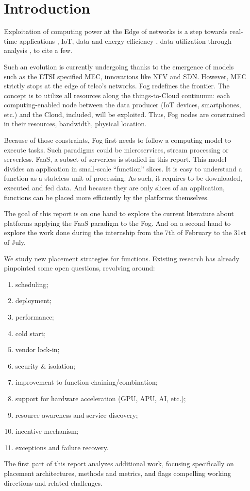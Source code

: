 \section{Introduction}

Exploitation of computing power at the Edge of networks is a step towards real-time applications \cite{rausch_towards_2021,lin_cloudfog_2017}, \gls{IoT}, data and energy efficiency \cite{ieee_standards_association_ieee_2018}, data utilization through analysis \cite{openfog_consortium_real-time_2018}, to cite a few.

Such an evolution is currently undergoing thanks to the emergence of models such as the \gls{ETSI} specified \gls{MEC}, innovations like \gls{NFV} and \gls{SDN}. However, \gls{MEC} strictly stops at the edge of telco’s networks. Fog redefines the frontier. The concept is to utilize all resources along the things-to-Cloud continuum: each computing-enabled node between the data producer (\gls{IoT} devices, smartphones, etc.) and the Cloud, included, will be exploited. Thus, Fog nodes are constrained in their resources, bandwidth, physical location.

Because of those constraints, Fog first needs to follow a computing model to execute tasks. Such paradigms could be microservices, stream processing or serverless. \gls{FaaS}, a subset of serverless is studied in this report. This model divides an application in small-scale “function” slices. It is easy to understand a function as a stateless unit of processing. As such, it requires to be downloaded, executed and fed data. And because they are only slices of an application, functions can be placed more efficiently by the platforms themselves.

The goal of this report is on one hand to explore the current literature about platforms applying the \gls{FaaS} paradigm to the Fog. And on a second hand to explore the work done during the internship from the 7th of February to the 31st of July.

We study new placement strategies for functions. Existing research \cite{kjorveziroski_iot_2021,xie_when_2021} has already pinpointed some open questions, revolving around:
\begin{enumerate}[(1)]
	\item scheduling;
	\item deployment;
	\item performance;
	\item cold start;
	\item vendor lock-in;
	\item security \& isolation;
	\item improvement to function chaining/combination;
	\item support for hardware acceleration (\gls{GPU}, \gls{APU}, \gls{AI}, etc.);
	\item resource awareness and service discovery;
	\item incentive mechanism;
	\item exceptions and failure recovery.
\end{enumerate}
The first part of this report analyzes additional work, focusing specifically on placement architectures, methods and metrics, and flags compelling working directions and related challenges.

